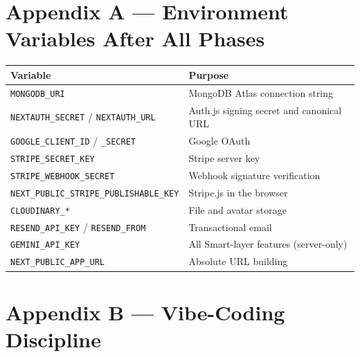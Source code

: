 \documentclass[11pt,a4paper]{article}
\begin{document}
\section{Appendix A --- Environment Variables After All Phases}

\begin{table}[h]
\small
\begin{tabularx}{\textwidth}{@{}lX@{}}
\toprule
\textbf{Variable} & \textbf{Purpose} \\
\midrule
\texttt{MONGODB\_URI}                        & MongoDB Atlas connection string \\
\texttt{NEXTAUTH\_SECRET} / \texttt{NEXTAUTH\_URL} & Auth.js signing secret and canonical URL \\
\texttt{GOOGLE\_CLIENT\_ID} / \texttt{\_SECRET} & Google OAuth \\
\texttt{STRIPE\_SECRET\_KEY}                 & Stripe server key \\
\texttt{STRIPE\_WEBHOOK\_SECRET}             & Webhook signature verification \\
\texttt{NEXT\_PUBLIC\_STRIPE\_PUBLISHABLE\_KEY} & Stripe.js in the browser \\
\texttt{CLOUDINARY\_*}                       & File and avatar storage \\
\texttt{RESEND\_API\_KEY} / \texttt{RESEND\_FROM} & Transactional email \\
\texttt{GEMINI\_API\_KEY}                    & All Smart-layer features (server-only) \\
\texttt{NEXT\_PUBLIC\_APP\_URL}              & Absolute URL building \\
\bottomrule
\end{tabularx}
\end{table}

\section{Appendix B --- Vibe-Coding Discipline}
\end{document}
